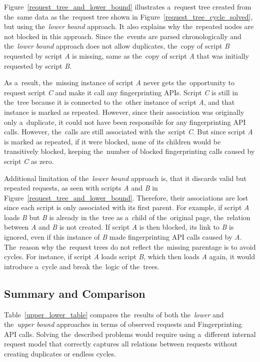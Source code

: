 Figure~\ref{request_tree_and_lower_bound} illustrates a~request tree created from the~same data as the~request tree shown in Figure~\ref{request_tree_cycle_solved}, but using the~\emph{lower bound} approach. It also explains why the~repeated nodes are not blocked in this approach. Since the~events are parsed chronologically and the~\emph{lower bound} approach does not allow duplicates, the~copy of script \emph{B} requested by script \emph{A} is missing, same as the~copy of script \emph{A} that was initially requested by script \emph{B}.

As a~result, the~missing instance of script \emph{A} never gets the~opportunity to request script \emph{C} and make it call any fingerprinting APIs. Script \emph{C} is still in the~tree because it is connected to the~other instance of script \emph{A}, and that instance is marked as repeated. However, since their association was originally only a~duplicate, it could not have been responsible for any fingerprinting API calls. However, the~calls are still associated with the~script \emph{C}. But since script \emph{A} is marked as repeated, if it were blocked, none of its children would be transitively blocked, keeping the~number of blocked fingerprinting calls caused by script \emph{C} as zero.

Additional limitation of the~\emph{lower bound} approach is, that it discards valid but repeated requests, as seen with scripts \emph{A} and \emph{B} in Figure~\ref{request_tree_and_lower_bound}. Therefore, their associations are lost since each script is only associated with its first parent. For example, if script \emph{A} loads \emph{B} but \emph{B} is already in the~tree as a~child of the~original page, the~relation between \emph{A} and \emph{B} is not created. If script \emph{A} is then blocked, its link to \emph{B} is ignored, even if this instance of \emph{B} made fingerprinting API calls caused by \emph{A}. The~reason why the~request trees do not reflect the~missing parentage is to avoid cycles. For instance, if script \emph{A} loads script \emph{B}, which then loads \emph{A} again, it would introduce a~cycle and break the~logic of the~trees.


\subsection{Summary and Comparison}
Table~\ref{upper_lower_table} compares the~results of both the~\emph{lower} and the~\emph{upper bound} approaches in terms of observed requests and Fingerprinting API calls. Solving the~described problems would require using a~different internal request model that correctly captures all relations between requests without creating duplicates or endless cycles.

